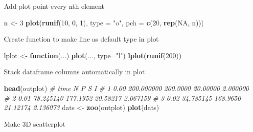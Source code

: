 \documentclass[10,portrait]{article}
\newenvironment{Shaded}{\begin{snugshade}}{\end{snugshade}}
\newcommand{\KeywordTok}[1]{\textcolor[rgb]{0.13,0.29,0.53}{\textbf{#1}}}
\newcommand{\DataTypeTok}[1]{\textcolor[rgb]{0.13,0.29,0.53}{#1}}
\newcommand{\DecValTok}[1]{\textcolor[rgb]{0.00,0.00,0.81}{#1}}
\newcommand{\StringTok}[1]{\textcolor[rgb]{0.31,0.60,0.02}{#1}}
\newcommand{\CommentTok}[1]{\textcolor[rgb]{0.56,0.35,0.01}{\textit{#1}}}
\newcommand{\OtherTok}[1]{\textcolor[rgb]{0.56,0.35,0.01}{#1}}
\newcommand{\ControlFlowTok}[1]{\textcolor[rgb]{0.13,0.29,0.53}{\textbf{#1}}}
\newcommand{\NormalTok}[1]{#1}
\begin{document}
Add plot point every nth element

\begin{Shaded}
\begin{Highlighting}[]
\NormalTok{n <-}\StringTok{ }\DecValTok{3}
\KeywordTok{plot}\NormalTok{(}\KeywordTok{runif}\NormalTok{(}\DecValTok{10}\NormalTok{, }\DecValTok{0}\NormalTok{, }\DecValTok{1}\NormalTok{), }\DataTypeTok{type =} \StringTok{"o"}\NormalTok{, }\DataTypeTok{pch =} \KeywordTok{c}\NormalTok{(}\DecValTok{20}\NormalTok{, }\KeywordTok{rep}\NormalTok{(}\OtherTok{NA}\NormalTok{, n)))}
\end{Highlighting}
\end{Shaded}

Create function to make line as default type in plot

\begin{Shaded}
\begin{Highlighting}[]
\NormalTok{lplot <-}\StringTok{ }\ControlFlowTok{function}\NormalTok{(...) }\KeywordTok{plot}\NormalTok{(..., }\DataTypeTok{type=}\StringTok{"l"}\NormalTok{)}
\KeywordTok{lplot}\NormalTok{(}\KeywordTok{runif}\NormalTok{(}\DecValTok{200}\NormalTok{))}
\end{Highlighting}
\end{Shaded}

Stack dataframe columns automatically in plot

\begin{Shaded}
\begin{Highlighting}[]
\KeywordTok{head}\NormalTok{(outplot)}
  \CommentTok{# time          N        P        S        I}
\CommentTok{# 1 0.00 200.000000 200.0000 20.00000 2.000000}
\CommentTok{# 2 0.01  78.245140 177.1952 20.58217 2.067159}
\CommentTok{# 3 0.02  34.785145 168.9650 21.12174 2.136073}
\NormalTok{dats <-}\StringTok{ }\KeywordTok{zoo}\NormalTok{(outplot)}
\KeywordTok{plot}\NormalTok{(dats)}
\end{Highlighting}
\end{Shaded}

Make 3D scatterplot
\end{document}
